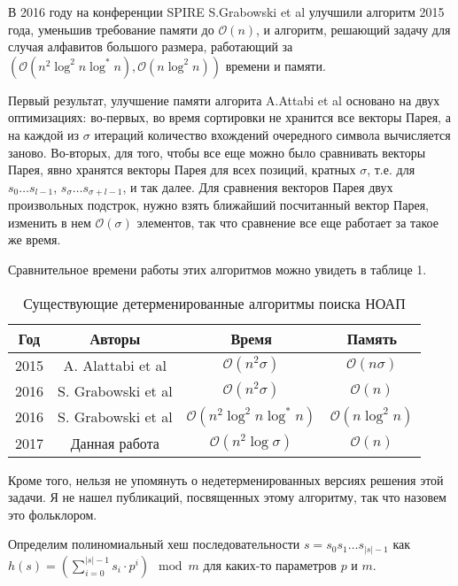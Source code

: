 В 2016 году на конференции SPIRE S.Grabowski et al \cite{4} улучшили алгоритм 2015 года, уменьшив требование памяти до $\mathcal{O}(n)$, и алгоритм, решающий задачу для случая алфавитов большого размера, работающий за $(\mathcal{O}(n^2 \log^2 n \log^* n), \mathcal{O}(n \log^2 n))$ времени и памяти. 

Первый результат, улучшение памяти алгорита A.Attabi et al основано на двух оптимизациях: во-первых, во время сортировки не хранится все векторы Парея, а на каждой из $\sigma$ итераций количество вхождений очередного символа вычисляется заново. Во-вторых, для того, чтобы все еще можно было сравнивать векторы Парея, явно хранятся векторы Парея для всех позиций, кратных $\sigma$, т.е. для $s_0 \ldots s_{l-1}$, $s_\sigma \ldots s_{\sigma + l - 1}$, и так далее. Для сравнения векторов Парея двух произвольных подстрок, нужно взять ближайший посчитанный вектор Парея, изменить в нем $\mathcal{O}(\sigma)$ элементов, так что сравнение все еще работает за такое же время.


Сравнительное времени работы этих алгоритмов можно увидеть в таблице 1.

\begin{table}[H]
\begin{center}
\begin{tabular}{|c|c|c|c|}
\hline
Год & Авторы & Время & Память \\
\hline
2015 & A. Alattabi et al & $\mathcal{O}(n^2 \sigma)$ & $\mathcal{O}(n \sigma)$ \\
\hline
2016 & S. Grabowski et al & $\mathcal{O}(n^2 \sigma)$ & $\mathcal{O}(n)$ \\
\hline
2016 & S. Grabowski et al & $\mathcal{O}(n^2 \log^2 n \log^* n)$ & $\mathcal{O}(n \log^2 n)$ \\
\hline
2017 & Данная работа & $\mathcal{O}(n^2 \log \sigma)$ & $\mathcal{O}(n)$ \\
\hline
\end{tabular}
\end{center}
\caption{Существующие детерменированные алгоритмы поиска НОАП}
\end{table}

Кроме того, нельзя не упомянуть о недетерменированных версиях решения этой задачи. Я не нашел публикаций, посвященных этому алгоритму, так что назовем это фольклором.

Определим полиномиальный хеш последовательности $s=s_0s_1\ldots s_{|s|-1}$ как $h(s)=(\sum\limits_{i=0}^{|s|-1} s_i \cdot p^i) \mod{m}$ для каких-то параметров $p$ и $m$.

